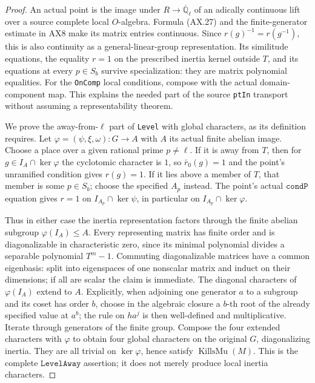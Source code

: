 \begin{proof}
An actual point is the image under $R\to\overline{\mathbb Q}_\ell$
of an adically continuous lift over a source complete local
$O$-algebra.  Formula (AX.27) and the finite-generator estimate
in AX8 make its matrix entries continuous.  Since
$r(g)^{-1}=r(g^{-1})$, this is also continuity as a
general-linear-group representation.  Its similitude equations,
the equality $r=1$ on the prescribed inertia kernel outside $T$,
and its equations at every $p\in S_b$ survive specialization:
they are matrix polynomial equalities.  For the \texttt{OnComp}
local conditions, compose with the actual domain-component map.
This explains the needed part of the source \texttt{ptIn}
transport without assuming a representability theorem.

We prove the away-from-$\ell$ part of \texttt{Level} with global
characters, as its definition requires.  Let
$\varphi=(\psi,\xi,\omega):G\to A$ with $A$ its actual finite
abelian image.  Choose a place over a given rational prime
$p\ne\ell$.  If it is away from $T$, then for
$g\in I_A\cap\ker\varphi$ the cyclotomic character is $1$,
so $\bar r_0(g)=1$ and the point's unramified condition gives
$r(g)=1$.  If it lies above a member of $T$, that member is
some $p\in S_b$; choose the specified $A_p$ instead.
The point's actual $\mathtt{condP}$ equation gives
$r=1$ on $I_{A_p}\cap\ker\psi$, in particular on
$I_{A_p}\cap\ker\varphi$.

Thus in either case the inertia representation factors through
the finite abelian subgroup $\varphi(I_A)\le A$.
Every representing matrix has finite order and is diagonalizable
in characteristic zero, since its minimal polynomial divides a
separable polynomial $T^m-1$.  Commuting diagonalizable matrices
have a common eigenbasis: split into eigenspaces of one nonscalar
matrix and induct on their dimensions; if all are scalar the
claim is immediate.  The diagonal characters of $\varphi(I_A)$
extend to $A$.  Explicitly, when adjoining one generator $a$ to
a subgroup and its coset has order $b$, choose in the algebraic
closure a $b$-th root of the already specified value at $a^b$;
the rule on $ha^j$ is then well-defined and multiplicative.
Iterate through generators of the finite group.  Compose the
four extended characters with $\varphi$ to obtain four global
characters on the original $G$, diagonalizing inertia.  They
are all trivial on $\ker\varphi$, hence satisfy
$\operatorname{KillsMu}(M)$.  This is the complete
$\mathtt{LevelAway}$ assertion; it does not merely produce
local inertia characters.


\end{proof}
